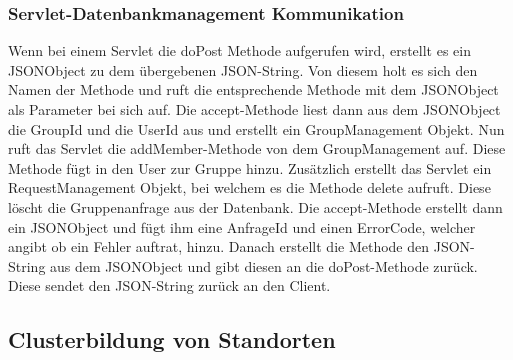 \subsubsection{Servlet-Datenbankmanagement Kommunikation}
\begin {center}
\end {center}
Wenn bei einem Servlet die doPost Methode aufgerufen wird, erstellt es ein JSONObject zu dem übergebenen JSON-String.
Von diesem holt es sich den Namen der Methode und ruft die entsprechende Methode mit dem JSONObject als Parameter bei sich auf. Die accept-Methode liest dann aus dem JSONObject die GroupId und die UserId aus und erstellt ein GroupManagement Objekt.
Nun ruft das Servlet die addMember-Methode von dem GroupManagement auf. Diese Methode fügt in den User zur Gruppe hinzu. Zusätzlich erstellt das Servlet ein RequestManagement Objekt, bei welchem es die Methode delete aufruft. Diese löscht die Gruppenanfrage aus der Datenbank. Die accept-Methode erstellt dann ein JSONObject und fügt ihm eine AnfrageId und einen ErrorCode, welcher angibt ob ein Fehler auftrat, hinzu. Danach erstellt die Methode den JSON-String aus dem JSONObject und gibt diesen an die doPost-Methode zurück. Diese sendet den JSON-String zurück an den Client.

\subsection{Clusterbildung von Standorten}


